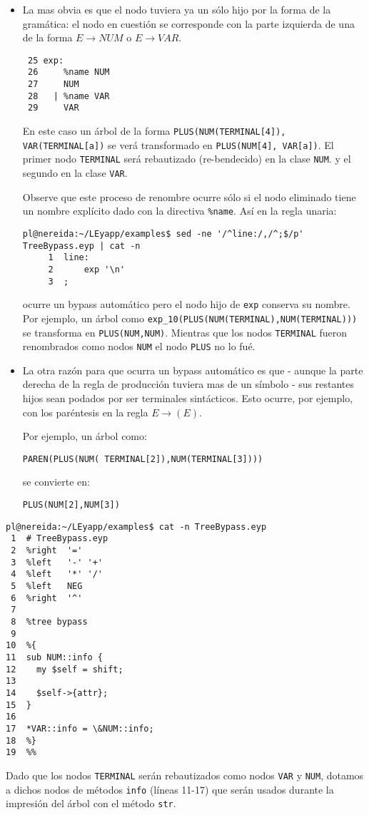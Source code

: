 \begin{itemize}
\item
La mas obvia es que el nodo tuviera ya un sólo hijo por la forma de la gramática:
el nodo en cuestión se corresponde con la parte izquierda de una  de la forma $E \rightarrow NUM$ o $E \rightarrow VAR$.

\begin{verbatim}
 25 exp:
 26     %name NUM
 27     NUM
 28   | %name VAR
 29     VAR
\end{verbatim}
En este caso un árbol de la forma \verb|PLUS(NUM(TERMINAL[4]), VAR(TERMINAL[a])| 
se verá transformado en \verb|PLUS(NUM[4], VAR[a])|. El primer nodo
\verb|TERMINAL| será rebautizado (re-bendecido) en la clase \verb|NUM|.
y el segundo en la clase \verb|VAR|.

Observe que este proceso de renombre ocurre sólo si 
el nodo eliminado tiene un nombre explícito dado con la directiva
\verb|%name|. Así en la regla unaria:
\begin{verbatim}
pl@nereida:~/LEyapp/examples$ sed -ne '/^line:/,/^;$/p' TreeBypass.eyp | cat -n
     1  line:
     2      exp '\n'
     3  ;
\end{verbatim}
ocurre un bypass automático  pero el nodo hijo de \verb|exp| conserva su nombre.
Por ejemplo, un árbol como
\verb|exp_10(PLUS(NUM(TERMINAL),NUM(TERMINAL)))|
se transforma en 
\verb|PLUS(NUM,NUM)|. Mientras que los nodos \verb|TERMINAL| fueron renombrados 
como nodos \verb|NUM| el nodo \verb|PLUS| no lo fué.

\item
La otra razón para que ocurra un bypass automático 
es que - aunque la parte derecha de la regla
de producción tuviera mas de un símbolo -
sus restantes hijos sean podados
por ser terminales sintácticos.  Esto ocurre, por ejemplo, con los
paréntesis en la regla
$E \rightarrow ( E )$.

Por ejemplo, un árbol como:
\begin{verbatim}
PAREN(PLUS(NUM( TERMINAL[2]),NUM(TERMINAL[3]))) 
\end{verbatim}
se convierte en:
\begin{verbatim}
PLUS(NUM[2],NUM[3])
\end{verbatim}
\end{itemize}


\begin{verbatim}
pl@nereida:~/LEyapp/examples$ cat -n TreeBypass.eyp
 1  # TreeBypass.eyp
 2  %right  '='
 3  %left   '-' '+'
 4  %left   '*' '/'
 5  %left   NEG
 6  %right  '^'
 7
 8  %tree bypass
 9
10  %{
11  sub NUM::info {
12    my $self = shift;
13
14    $self->{attr};
15  }
16
17  *VAR::info = \&NUM::info;
18  %}
19  %%
\end{verbatim}
Dado que los nodos \verb|TERMINAL| serán rebautizados como nodos \verb|VAR| y \verb|NUM|,
dotamos a dichos nodos de métodos \verb|info| (líneas 11-17)
que serán usados durante 
la impresión del árbol con el método \verb|str|.

